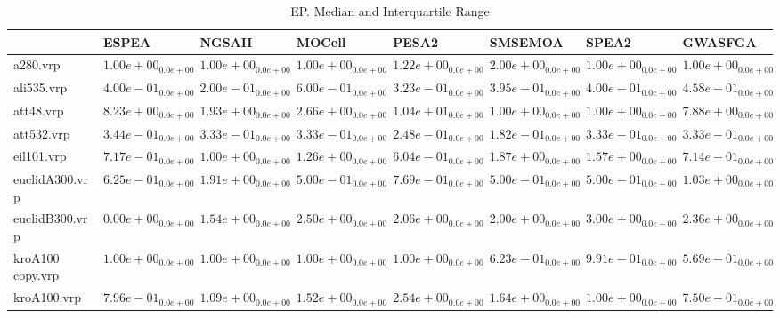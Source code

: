 \documentclass{article}
\begin{document}
\begin{table}
\caption{EP. Median and Interquartile Range}
\label{table: EP}
\centering
\begin{scriptsize}
\begin{tabular}{llllllll}
\hline & ESPEA & NGSAII & MOCell & PESA2 & SMSEMOA & SPEA2 &  GWASFGA\\
\hline 
a280.vrp & \cellcolor{gray95}$  1.00e+00_{ 0.0e+00}$ & \cellcolor{gray25}$  1.00e+00_{ 0.0e+00}$ & $  1.00e+00_{ 0.0e+00}$ & $  1.22e+00_{ 0.0e+00}$ & $  2.00e+00_{ 0.0e+00}$ & $  1.00e+00_{ 0.0e+00}$ & $  1.00e+00_{ 0.0e+00}$ \\
ali535.vrp & $  4.00e-01_{ 0.0e+00}$ & \cellcolor{gray95}$  2.00e-01_{ 0.0e+00}$ & $  6.00e-01_{ 0.0e+00}$ & \cellcolor{gray25}$  3.23e-01_{ 0.0e+00}$ & $  3.95e-01_{ 0.0e+00}$ & $  4.00e-01_{ 0.0e+00}$ & $  4.58e-01_{ 0.0e+00}$ \\
att48.vrp & $  8.23e+00_{ 0.0e+00}$ & $  1.93e+00_{ 0.0e+00}$ & $  2.66e+00_{ 0.0e+00}$ & $  1.04e+01_{ 0.0e+00}$ & \cellcolor{gray95}$  1.00e+00_{ 0.0e+00}$ & \cellcolor{gray25}$  1.00e+00_{ 0.0e+00}$ & $  7.88e+00_{ 0.0e+00}$ \\
att532.vrp & $  3.44e-01_{ 0.0e+00}$ & $  3.33e-01_{ 0.0e+00}$ & $  3.33e-01_{ 0.0e+00}$ & \cellcolor{gray25}$  2.48e-01_{ 0.0e+00}$ & \cellcolor{gray95}$  1.82e-01_{ 0.0e+00}$ & $  3.33e-01_{ 0.0e+00}$ & $  3.33e-01_{ 0.0e+00}$ \\
eil101.vrp & $  7.17e-01_{ 0.0e+00}$ & $  1.00e+00_{ 0.0e+00}$ & $  1.26e+00_{ 0.0e+00}$ & \cellcolor{gray95}$  6.04e-01_{ 0.0e+00}$ & $  1.87e+00_{ 0.0e+00}$ & $  1.57e+00_{ 0.0e+00}$ & \cellcolor{gray25}$  7.14e-01_{ 0.0e+00}$ \\
euclidA300.vrp & $  6.25e-01_{ 0.0e+00}$ & $  1.91e+00_{ 0.0e+00}$ & \cellcolor{gray95}$  5.00e-01_{ 0.0e+00}$ & $  7.69e-01_{ 0.0e+00}$ & \cellcolor{gray25}$  5.00e-01_{ 0.0e+00}$ & $  5.00e-01_{ 0.0e+00}$ & $  1.03e+00_{ 0.0e+00}$ \\
euclidB300.vrp & \cellcolor{gray95}$  0.00e+00_{ 0.0e+00}$ & \cellcolor{gray25}$  1.54e+00_{ 0.0e+00}$ & $  2.50e+00_{ 0.0e+00}$ & $  2.06e+00_{ 0.0e+00}$ & $  2.00e+00_{ 0.0e+00}$ & $  3.00e+00_{ 0.0e+00}$ & $  2.36e+00_{ 0.0e+00}$ \\
kroA100 copy.vrp & $  1.00e+00_{ 0.0e+00}$ & $  1.00e+00_{ 0.0e+00}$ & $  1.00e+00_{ 0.0e+00}$ & $  1.00e+00_{ 0.0e+00}$ & \cellcolor{gray25}$  6.23e-01_{ 0.0e+00}$ & $  9.91e-01_{ 0.0e+00}$ & \cellcolor{gray95}$  5.69e-01_{ 0.0e+00}$ \\
kroA100.vrp & \cellcolor{gray25}$  7.96e-01_{ 0.0e+00}$ & $  1.09e+00_{ 0.0e+00}$ & $  1.52e+00_{ 0.0e+00}$ & $  2.54e+00_{ 0.0e+00}$ & $  1.64e+00_{ 0.0e+00}$ & $  1.00e+00_{ 0.0e+00}$ & \cellcolor{gray95}$  7.50e-01_{ 0.0e+00}$ \\

\end{tabular}
\end{scriptsize}
\end{table}
\end{document}
